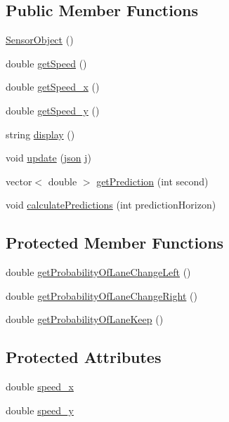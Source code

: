 \subsection*{Public Member Functions}
\begin{DoxyCompactItemize}
\item 
\hyperlink{classSensorObject_ac4ac2559d3fbe122bd585860d19f54a8}{Sensor\+Object} ()
\item 
double \hyperlink{classSensorObject_ab3e8516fb8273082efbc873266667486}{get\+Speed} ()
\item 
double \hyperlink{classSensorObject_abcd7baf59194b7fef7d0ec75eb880123}{get\+Speed\+\_\+x} ()
\item 
double \hyperlink{classSensorObject_a0fcc2d7351b630b61fbd5395ac568bc4}{get\+Speed\+\_\+y} ()
\item 
string \hyperlink{classSensorObject_adaa7350730c3c627f0f215c251386cb7}{display} ()
\item 
void \hyperlink{classSensorObject_a4d0023c0d36c15df10aade6ec224cc56}{update} (\hyperlink{main_8cpp_ab701e3ac61a85b337ec5c1abaad6742d}{json} j)
\item 
vector$<$ double $>$ \hyperlink{classSensorObject_a49714af72f563ce1114c9f43e95d7af8}{get\+Prediction} (int second)
\item 
void \hyperlink{classSensorObject_a6787ced615e75d519842ab2e893048ca}{calculate\+Predictions} (int prediction\+Horizon)
\end{DoxyCompactItemize}
\subsection*{Protected Member Functions}
\begin{DoxyCompactItemize}
\item 
double \hyperlink{classSensorObject_ad11229216ab0dcbbe82aaa9454720255}{get\+Probability\+Of\+Lane\+Change\+Left} ()
\item 
double \hyperlink{classSensorObject_a132c4fa7451f21b328bf8252e84fe823}{get\+Probability\+Of\+Lane\+Change\+Right} ()
\item 
double \hyperlink{classSensorObject_a3cae3fdbe83f10c4c308c1dc68540cd1}{get\+Probability\+Of\+Lane\+Keep} ()
\end{DoxyCompactItemize}
\subsection*{Protected Attributes}
\begin{DoxyCompactItemize}
\item 
double \hyperlink{classSensorObject_ae33a03dcbff51436ce91dbdc8c27f4b3}{speed\+\_\+x}
\item 
double \hyperlink{classSensorObject_aa5fa4bb2ebea9261cdb80b0ef31cb386}{speed\+\_\+y}
\end{DoxyCompactItemize}


